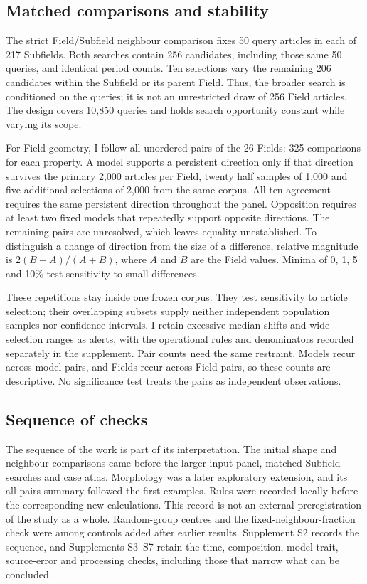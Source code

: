 \documentclass[12pt]{article}
\begin{document}
\subsection{Matched comparisons and stability}
The strict Field/Subfield neighbour comparison fixes 50 query articles in each of 217 Subfields. Both searches contain 256 candidates, including those same 50 queries, and identical period counts. Ten selections vary the remaining 206 candidates within the Subfield or its parent Field. Thus, the broader search is conditioned on the queries; it is not an unrestricted draw of 256 Field articles. The design covers 10,850 queries and holds search opportunity constant while varying its scope.

For Field geometry, I follow all unordered pairs of the 26 Fields: 325 comparisons for each property. A model supports a persistent direction only if that direction survives the primary 2,000 articles per Field, twenty half samples of 1,000 and five additional selections of 2,000 from the same corpus. All-ten agreement requires the same persistent direction throughout the panel. Opposition requires at least two fixed models that repeatedly support opposite directions. The remaining pairs are unresolved, which leaves equality unestablished. To distinguish a change of direction from the size of a difference, relative magnitude is $2(B-A)/(A+B)$, where $A$ and $B$ are the Field values. Minima of 0, 1, 5 and 10\% test sensitivity to small differences.

These repetitions stay inside one frozen corpus. They test sensitivity to article selection; their overlapping subsets supply neither independent population samples nor confidence intervals. I retain excessive median shifts and wide selection ranges as alerts, with the operational rules and denominators recorded separately in the supplement. Pair counts need the same restraint. Models recur across model pairs, and Fields recur across Field pairs, so these counts are descriptive. No significance test treats the pairs as independent observations.

\subsection{Sequence of checks}
The sequence of the work is part of its interpretation. The initial shape and neighbour comparisons came before the larger input panel, matched Subfield searches and case atlas. Morphology was a later exploratory extension, and its all-pairs summary followed the first examples. Rules were recorded locally before the corresponding new calculations. This record is not an external preregistration of the study as a whole. Random-group centres and the fixed-neighbour-fraction check were among controls added after earlier results. Supplement S2 records the sequence, and Supplements S3--S7 retain the time, composition, model-trait, source-error and processing checks, including those that narrow what can be concluded.
\end{document}
